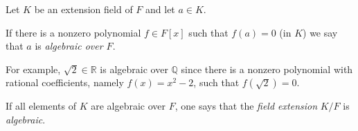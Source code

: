 \documentclass[12pt]{article}
\begin{document}
Let $K$ be an extension field of $F$ and let $a\in K$. 

If there is  a nonzero polynomial $f\in F[x]$ such that 
$f(a)=0$ (in $K$) we say that $a$ is \emph{algebraic over $F$}.

For example, $\sqrt{2}\in\mathbb{R}$ is algebraic over 
$\mathbb{Q}$ since there is a nonzero polynomial with rational 
coefficients, namely $f(x)=x^2-2$, such that $f(\sqrt{2})=0$.

If all elements of $K$ are algebraic over $F$, one says that 
the {\it field extension} $K/F$ is {\it algebraic}.
\end{document}
